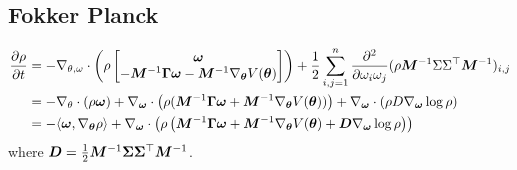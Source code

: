 \documentclass[11pt,twoside,a4paper]{article}
\begin{document}
\subsection{Fokker Planck}
\begin{align}
    \frac{\partial \rho}{\partial t} &= - \nabla_{\theta,\omega} \cdot \left( \rho\begin{bmatrix}
    {\bm{\omega}}  \\ 
 -{\bm{M}}^{-1}\bm{\Gamma} {\bm{\omega}} - {\bm{M}}^{-1} \nabla_{{\bm{\theta}}} V({\bm{\theta}})
    \end{bmatrix} \right) + \frac{1}{2}\sum_{i,j=1}^{n} \frac{\partial^2}{\partial \omega_{i}\omega_j } (\rho {\bm{M}}^{-1}\Sigma \Sigma^{\top} {\bm{M}}^{-1} )_{i,j} \nonumber \\
     &= -\nabla_{\theta} \cdot( \rho {\bm{\omega}}) + \nabla_{{\bm{\omega}}} \cdot \left( \rho ({\bm{M}}^{-1}\bm{\Gamma}{\bm{\omega}} + {\bm{M}}^{-1}\nabla_{{\bm{\theta}}}V({\bm{\theta}}) )\right) + \nabla_{{\bm{\omega}}} \cdot \left( \rho D \nabla_{{\bm{\omega}}} \log \rho \right) \nonumber \\
     &= - \langle {\bm{\omega}} ,\nabla_{{\bm{\theta}}}\rho \rangle  + \nabla_{{\bm{\omega}}} \cdot \left( \rho \left( {\bm{M}}^{-1}\bm{\Gamma}{\bm{\omega}} + {\bm{M}}^{-1}\nabla_{{\bm{\theta}}}V({\bm{\theta}}) +{\bm{D}} \nabla_{{\bm{\omega}}} \log \rho \right) \right)
\end{align}
where ${\bm{D}}=\frac{1}{2} {\bm{M}}^{-1}{\bm{\Sigma}} {\bm{\Sigma}}^{\top}{\bm{M}}^{-1}$.
\end{document}
